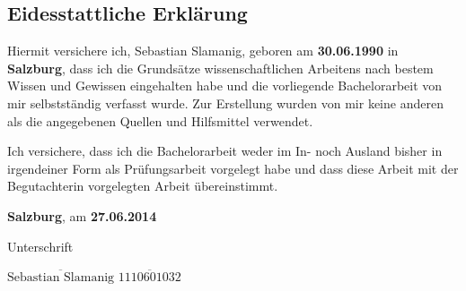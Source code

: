 \subsection*{Eidesstattliche Erklärung}

Hiermit versichere ich, Sebastian Slamanig, geboren am {\bf 30.06.1990} in {\bf Salzburg}, dass ich die Grundsätze wissenschaftlichen Arbeitens nach bestem Wissen und Gewissen eingehalten habe und die vorliegende Bachelorarbeit von mir selbstständig verfasst wurde. Zur Erstellung wurden von mir keine anderen als die angegebenen Quellen und Hilfsmittel verwendet. 

Ich versichere, dass ich die Bachelorarbeit weder im In- noch Ausland bisher in irgendeiner Form als Prüfungsarbeit vorgelegt habe und dass diese Arbeit mit der Begutachterin vorgelegten Arbeit übereinstimmt.


\vspace*{3cm}

{\bf Salzburg}, am {\bf 27.06.2014}


\hfill


Unterschrift

\vspace*{1cm}

$\overline{\text{Sebastian Slamanig}}$ \hfill	$\overline{\text{1110601032}}$

